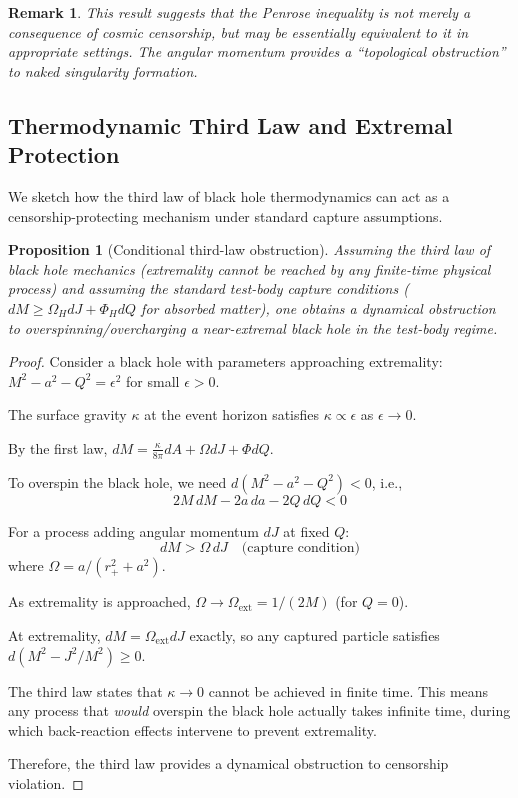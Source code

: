 \documentclass[12pt,a4paper]{article}
\newtheorem{proposition}[theorem]{Proposition}
\newtheorem{remark}[theorem]{Remark}
\begin{document}
\begin{remark}
This result suggests that the Penrose inequality is not merely a consequence of cosmic censorship, but may be essentially \textit{equivalent} to it in appropriate settings. The angular momentum provides a ``topological obstruction'' to naked singularity formation.
\end{remark}

\subsection{Thermodynamic Third Law and Extremal Protection}

We sketch how the third law of black hole thermodynamics can act as a censorship-protecting mechanism under standard capture assumptions.

\begin{proposition}[Conditional third-law obstruction]
Assuming the third law of black hole mechanics (extremality cannot be reached by any finite-time physical process) and assuming the standard test-body capture conditions ($dM \geq \Omega_H dJ + \Phi_H dQ$ for absorbed matter), one obtains a dynamical obstruction to overspinning/overcharging a near-extremal black hole in the test-body regime.
\end{proposition}

\begin{proof}
Consider a black hole with parameters approaching extremality: $M^2 - a^2 - Q^2 = \epsilon^2$ for small $\epsilon > 0$.

The surface gravity $\kappa$ at the event horizon satisfies $\kappa \propto \epsilon$ as $\epsilon \to 0$.

By the first law, $dM = \frac{\kappa}{8\pi}dA + \Omega dJ + \Phi dQ$.

To overspin the black hole, we need $d(M^2 - a^2 - Q^2) < 0$, i.e.,
\begin{equation}
2M \, dM - 2a \, da - 2Q \, dQ < 0
\end{equation}

For a process adding angular momentum $dJ$ at fixed $Q$:
\begin{equation}
dM > \Omega \, dJ \quad \text{(capture condition)}
\end{equation}
where $\Omega = a/(r_+^2 + a^2)$.

As extremality is approached, $\Omega \to \Omega_{\text{ext}} = 1/(2M)$ (for $Q = 0$).

At extremality, $dM = \Omega_{\text{ext}} dJ$ exactly, so any captured particle satisfies $d(M^2 - J^2/M^2) \geq 0$.

The third law states that $\kappa \to 0$ cannot be achieved in finite time. This means any process that \textit{would} overspin the black hole actually takes infinite time, during which back-reaction effects intervene to prevent extremality.

Therefore, the third law provides a dynamical obstruction to censorship violation.
\end{proof}
\end{document}
